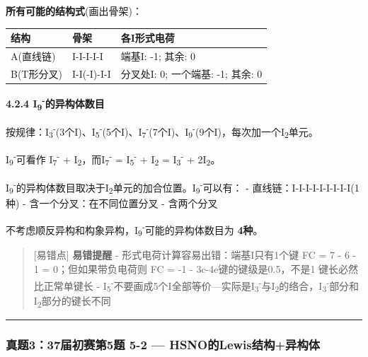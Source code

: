 \textbf{所有可能的结构式}(画出骨架)：

{\def\LTcaptype{none} %
\begin{longtable}[]{@{}lll@{}}
\toprule\noalign{}
结构 & 骨架 & 各I形式电荷 \\
\midrule\noalign{}
\endhead
\bottomrule\noalign{}
\endlastfoot
A(直线链) & I-I-I-I-I & 端基I: -1; 其余: 0 \\
B(T形分叉) & I-I(-I)-I-I & 分叉处I: 0; 一个端基: -1; 其余: 0 \\
\end{longtable}
}

\textbf{4.2.4 I\textsubscript{9}\textsuperscript{-}的异构体数目}

按规律：I\textsubscript{3}\textsuperscript{-}(3个I)、I\textsubscript{5}\textsuperscript{-}(5个I)、I\textsubscript{7}\textsuperscript{-}(7个I)、I\textsubscript{9}\textsuperscript{-}(9个I)，每次加一个I\textsubscript{2}单元。

I\textsubscript{9}\textsuperscript{-}可看作 I\textsubscript{7}\textsuperscript{-} + I\textsubscript{2}，而I\textsubscript{7}\textsuperscript{-} = I\textsubscript{5}\textsuperscript{-} + I\textsubscript{2} = I\textsubscript{3}\textsuperscript{-} + 2I\textsubscript{2}。

I\textsubscript{9}\textsuperscript{-}的异构体数目取决于I\textsubscript{2}单元的加合位置。I\textsubscript{9}\textsuperscript{-}可以有：
- 直线链：I-I-I-I-I-I-I-I-I(1种)
- 含一个分叉：在不同位置分叉
- 含两个分叉

不考虑顺反异构和构象异构，I\textsubscript{9}\textsuperscript{-}可能的异构体数目为 \textbf{4种}。

\begin{quote}
{[}易错点{]} \textbf{易错提醒}
- 形式电荷计算容易出错：端基I只有1个键 \箭 FC = 7 - 6 - 1 = 0；但如果带负电荷则 FC = -1
- 3c-4e键的键级是0.5，不是1 \箭 键长必然比正常单键长
- I\textsubscript{5}\textsuperscript{-}不要画成5个I全部等价---实际是I\textsubscript{3}\textsuperscript{-}与I\textsubscript{2}的络合，I\textsubscript{3}\textsuperscript{-}部分和I\textsubscript{2}部分的键长不同
\end{quote}

\begin{center}\rule{0.5\linewidth}{0.5pt}\end{center}

\subsubsection{真题3：37届初赛第5题 5-2 --- HSNO的Lewis结构+异构体}\label{ux771fux9898337ux5c4aux521dux8d5bux7b2c5ux9898-5-2-hsnoux7684lewisux7ed3ux6784ux5f02ux6784ux4f53}

